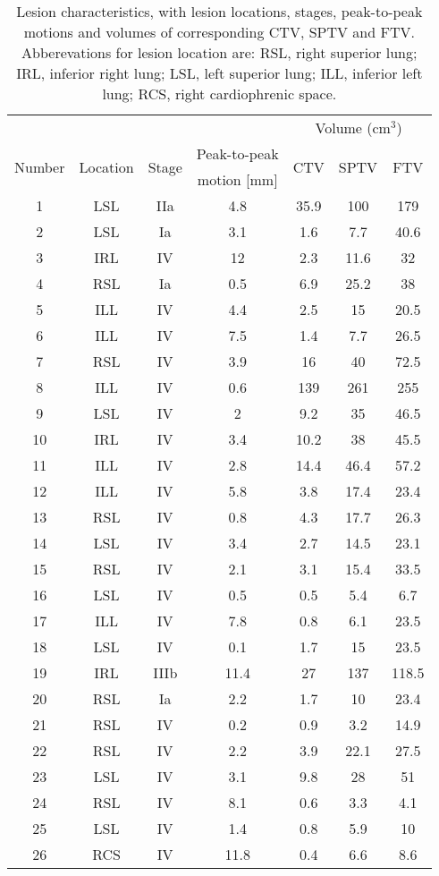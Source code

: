 \documentclass[type=dr, dr=rernat, accentcolor=tud7b,colorbacktitle, bigchapter, openright, twoside, 12pt ]{tudthesis}
\begin{document}
\begin{table}[H]
	\centering
	\caption{Lesion characteristics, with lesion locations, stages, peak-to-peak motions and volumes of corresponding CTV, SPTV and FTV. Abberevations for lesion location are: 
		RSL, right superior lung; IRL, inferior right lung; LSL, left superior lung; ILL, inferior left lung; RCS, right cardiophrenic space.}
	\begin{tabular}{|c|c|c|c|c|c|c|}
		\hline\hline
		& & & & \multicolumn{3}{|c|}{Volume (cm$^3$)} \\ \cline{5-7}
		\multirow{2}{*}{Number} & \multirow{2}{*}{Location} & \multirow{2}{*}{Stage} &
		Peak-to-peak & \multirow{2}{*}{CTV} & \multirow{2}{*}{SPTV} & \multirow{2}{*}{FTV}\\
		&  & & motion [mm] & & & \\
		\hline
		1 & LSL & IIa & 4.8 & 35.9 & 100 & 179 \\
		2 & LSL & Ia & 3.1 & 1.6 & 7.7 & 40.6 \\
		3 & IRL & IV & 12 & 2.3 & 11.6 & 32 \\
		4 & RSL & Ia & 0.5 & 6.9 & 25.2 & 38 \\
		5 & ILL & IV & 4.4 & 2.5 & 15 & 20.5 \\
		6 & ILL & IV & 7.5 & 1.4 & 7.7 & 26.5 \\
		7 & RSL & IV & 3.9 & 16 & 40 & 72.5 \\
		8 & ILL & IV & 0.6 & 139 & 261 & 255 \\
		9 & LSL & IV & 2 & 9.2 & 35 & 46.5 \\
		10 & IRL & IV & 3.4 & 10.2 & 38 & 45.5 \\
		11 & ILL & IV & 2.8 & 14.4 & 46.4 & 57.2 \\
		12 & ILL & IV & 5.8 & 3.8 & 17.4 & 23.4 \\
		13 & RSL & IV & 0.8 & 4.3 & 17.7 & 26.3 \\
		14 & LSL & IV & 3.4 & 2.7 & 14.5 & 23.1 \\
		15 & RSL & IV & 2.1 & 3.1 & 15.4 & 33.5 \\
		16 & LSL & IV & 0.5 & 0.5 & 5.4 & 6.7 \\
		17 & ILL & IV & 7.8 & 0.8 & 6.1 & 23.5 \\
		18 & LSL & IV & 0.1 & 1.7 & 15 & 23.5 \\
		19 & IRL & IIIb & 11.4 & 27 & 137 & 118.5 \\
		20 & RSL & Ia & 2.2 & 1.7 & 10 & 23.4 \\
		21 & RSL & IV & 0.2 & 0.9 & 3.2 & 14.9 \\
		22 & RSL & IV & 2.2 & 3.9 & 22.1 & 27.5 \\
		23 & LSL & IV & 3.1 & 9.8 & 28 & 51 \\
		24 & RSL & IV & 8.1 & 0.6 & 3.3 & 4.1 \\
		25 & LSL & IV & 1.4 & 0.8 & 5.9 & 10 \\
		26 & RCS & IV & 11.8 & 0.4 & 6.6 & 8.6 \\
		
		\hline\hline
	\end{tabular}
	\label{tab:patdata2}
\end{table}
\end{document}
